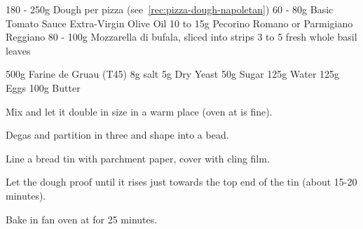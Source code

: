 \begin{ingreds}
	180 - 250g Dough per pizza (see~\ref{rec:pizza-dough-napoletan})
	60 - 80g Basic Tomato Sauce
	Extra-Virgin Olive Oil 
	10 to 15g Pecorino Romano or Parmigiano Reggiano
	80 - 100g Mozzarella di bufala, sliced into strips
	3 to 5 fresh whole basil leaves
\end{ingreds}


\label{rec:bread-brioche}

\begin{ingreds}
	500g Farine de Gruau (T45)
	8g salt
	5g Dry Yeast
	50g Sugar
	125g Water
	125g Eggs
	100g Butter
\end{ingreds}

\begin{method}[]
	Mix and let it double in size in a warm place (oven at  is fine).

	Degas and partition in three and shape into a bead.

	Line a bread tin with parchment paper, cover with cling film.
	
	Let the dough proof until it rises just towards the top end of the tin (about 15-20 minutes).

	Bake in fan oven at  for 25 minutes.
\end{method}

